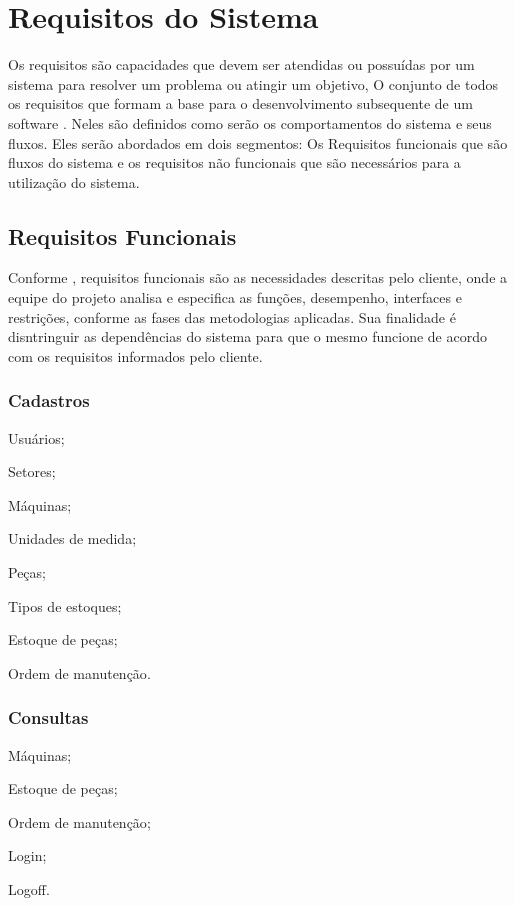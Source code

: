 \chapter{Requisitos do Sistema}
Os requisitos são capacidades que devem ser atendidas ou possuídas por um sistema para resolver um problema ou atingir um objetivo, O conjunto de todos os requisitos que formam a base para o desenvolvimento subsequente de um software \cite{vazquez2016}. Neles são definidos como serão os comportamentos do sistema e seus fluxos. Eles serão abordados em dois segmentos: Os Requisitos funcionais que são fluxos do sistema e os requisitos não funcionais que são necessários para a utilização do sistema.

\section{Requisitos Funcionais}

{ Conforme \cite{essi2005}, requisitos funcionais são as necessidades descritas pelo cliente, onde a equipe do projeto analisa e
especifica as funções, desempenho, interfaces e restrições, conforme as fases das metodologias aplicadas. Sua finalidade é disntringuir as dependências do sistema para que o mesmo funcione de acordo com os requisitos informados pelo cliente. }

\subsection{Cadastros}


\begin{subalineas}
	\item {Usuários};
	\item {Setores};
	\item {Máquinas};
	\item {Unidades de medida};
	\item {Peças};
	\item {Tipos de estoques};
	\item {Estoque de peças};
	\item {Ordem de manutenção}.
\end{subalineas}

\subsection{Consultas}
\begin{subalineas}
	\item {Máquinas};
	\item {Estoque de peças};
	\item {Ordem de manutenção};
	\item {Login};
	\item {Logoff}.
\end{subalineas}

